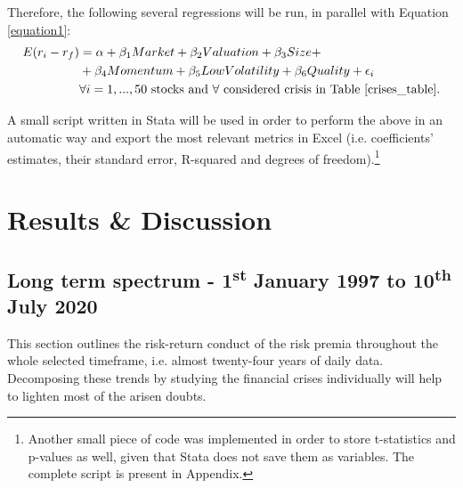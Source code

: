 \documentclass[12pt]{article}
\begin{document}
Therefore, the following several regressions will be run, in parallel with Equation \ref{equation1}:
\begin{equation} \label{equation2}
\begin{split}
E(r_i - r_f) &= \alpha+\beta_1 Market +\beta_2 Valuation + \beta_3 Size + \\
&  + \beta_4 Momentum + \beta_5 LowVolatility +\beta_6 Quality + \epsilon_i \\
& \forall  i=1,...,50 \text{ stocks and } \forall \text{ considered crisis in Table \ref{crises_table}.}
\end{split}
\end{equation}

A small script written in Stata will be used in order to perform the above in an automatic way and export the most relevant metrics in Excel (i.e. coefficients' estimates, their standard error, R-squared and degrees of freedom).\footnote{Another small piece of code was implemented in order to store t-statistics and p-values as well, given that Stata does not save them as variables. The complete script is present in Appendix.}

\newpage
\section{Results \& Discussion}

\subsection{Long term spectrum - 1\textsuperscript{st} January 1997 to 10\textsuperscript{th} July 2020} \label{whole_period}
This section outlines the risk-return conduct of the risk premia throughout the whole selected timeframe, i.e. almost twenty-four years of daily data. Decomposing these trends by studying the financial crises individually will help to lighten most of the arisen doubts. \\
\end{document}
